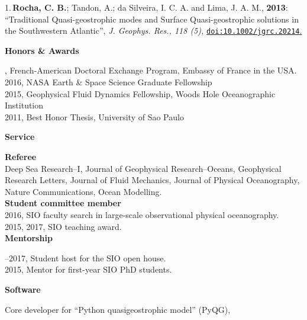 \documentclass[a4paper,11pt,final]{memoir}
\newcommand{\Sep}{\vspace{1.25em}}
\newcommand{\SmallSep}{\vspace{0.5em}}
\newcommand{\CVSection}[1]
    {\Large\textbf{#1}\par
    \SmallSep\normalsize\normalfont}
\newcommand{\CVItem}[1]
    {\textbf{\color{NavyBlue} #1}}
\begin{document}
\SmallSep

1.\,\textbf{Rocha, C. B.}; Tandon, A.; da Silveira, I. C. A. and Lima, J. A. M., \textbf{2013}: ``Traditional Quasi-geostrophic modes and Surface Quasi-geostrophic solutions in the Southwestern Atlantic'', \textit{ J. Geophys. Res., 118 (5),} \href{http://dx.doi.org/10.1002/jgrc.20214}{\texttt{doi:10.1002/jgrc.20214}.}

\SmallSep

\clearpage
\framebreak
\framebreak


%
%

\CVSection{Honors \& Awards}
2017, French-American Doctoral Exchange Program, Embassy of France in the USA.\\
2016, NASA Earth \& Space Science Graduate Fellowship\\
2015, Geophysical Fluid Dynamics Fellowship, Woods Hole Oceanographic Institution\\
2011, Best Honor Thesis, University of Sao Paulo

\Sep

\CVSection{Service}

\CVItem{Referee}\\
Deep Sea Research--I, Journal of Geophysical Research--Oceans,
           Geophysical Research Letters, Journal of
           Fluid Mechanics, Journal of Physical Oceanography, Nature Communications, Ocean Modelling. \\

\CVItem{Student committee member}\\
2016, SIO faculty search in large-scale observational physical oceanography.\\
2015, 2017,  SIO teaching award.\\

\CVSection{Mentorship}
2015--2017, Student host for the SIO open house.\\
2015,  Mentor for first-year SIO PhD students.

\Sep

%
%

\CVSection{Software}

Core developer for ``Python quasigeostrophic model'' (PyQG),
\end{document}
